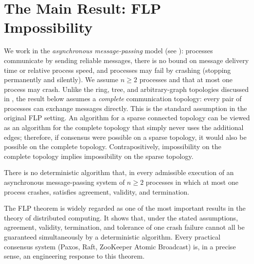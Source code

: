 \section{The Main Result: FLP Impossibility}\label{sec:main-result}

We work in the \emph{asynchronous message-passing} model (see ): processes communicate by sending reliable messages, there is no bound on message delivery time or relative process speed, and processes may fail by crashing (stopping permanently and silently). We assume $n\ge 2$ processes and that at most one process may crash. Unlike the ring, tree, and arbitrary-graph topologies discussed in , the result below assumes a \emph{complete} communication topology: every pair of processes can exchange messages directly. This is the standard assumption in the original FLP setting. An algorithm for a sparse connected topology can be viewed as an algorithm for the complete topology that simply never uses the additional edges; therefore, if consensus were possible on a sparse topology, it would also be possible on the complete topology. Contrapositively, impossibility on the complete topology implies impossibility on the sparse topology.

\begin{smjtheorem}\label{thm:flp}
There is no deterministic algorithm that, in every admissible execution of an asynchronous message-passing system of $n\ge 2$ processes in which at most one process crashes, satisfies agreement, validity, and termination.
\end{smjtheorem}

\begin{smjremark}[Significance]
The FLP theorem is widely regarded as one of the most important results in the theory of distributed computing. It shows that, under the stated assumptions, agreement, validity, termination, and tolerance of one crash failure cannot all be guaranteed simultaneously by a deterministic algorithm. Every practical consensus system (Paxos, Raft, ZooKeeper Atomic Broadcast) is, in a precise sense, an engineering response to this theorem.
\end{smjremark}


